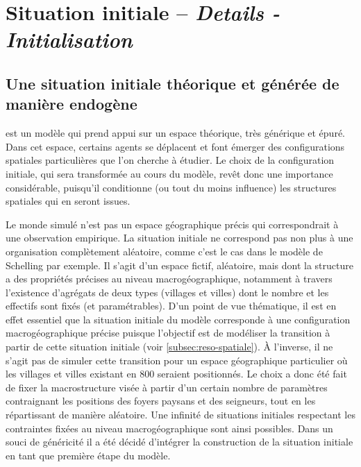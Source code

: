 \let\orisectionmark\sectionmark
\renewcommand\sectionmark[1]{}%
\section[Situation initiale -- \textit{Details - Initialisation}]{Situation initiale -- \large{\textit{Details - Initialisation}}\label{sec:initialisation}}
\orisectionmark{Situation initiale}
\let\sectionmark\orisectionmark

\setcounter{savefootnote}{\value{footnote}}

\subsection{Une situation initiale théorique et générée de manière endogène}

\simfeodal{} est un modèle qui prend appui sur un espace théorique, très générique et épuré.
Dans cet espace, certains agents se déplacent et font émerger des configurations spatiales particulières que l'on cherche à étudier.
Le choix de la configuration initiale, qui sera transformée au cours du modèle, revêt donc une importance considérable, puisqu'il conditionne (ou tout du moins influence) les structures spatiales qui en seront issues.

Le \og monde\fg{} simulé n'est pas un espace géographique précis qui correspondrait à une observation empirique.
La situation initiale ne correspond pas non plus à une organisation complètement aléatoire, comme c'est le cas dans le modèle de Schelling par exemple.
Il s'agit d'un espace fictif, aléatoire, mais dont la structure a des propriétés précises au niveau macrogéographique, notamment à travers l'existence d’agrégats de deux types (villages et villes) dont le nombre et les effectifs sont fixés (et paramétrables).
D'un point de vue thématique, il est en effet essentiel que la situation initiale du modèle \simfeodal{} corresponde à une configuration macrogéographique précise puisque l'objectif est de modéliser la transition à partir de cette situation initiale (voir \cref{subsec:reso-spatiale}).
À l'inverse, il ne s'agit pas de simuler cette transition pour un espace géographique particulier où les villages et villes existant en 800 seraient positionnés.
Le choix a donc été fait de fixer la macrostructure visée à partir d'un certain nombre de paramètres contraignant les positions des foyers paysans et des seigneurs, tout en les répartissant de manière aléatoire.
Une infinité de situations initiales respectant les contraintes fixées au niveau macrogéographique sont ainsi possibles.
Dans un souci de généricité il a été décidé d'intégrer la construction de la situation initiale en tant que première étape du modèle.

